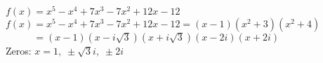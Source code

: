 {$f(x) = x^5 - x^4+7x^3-7x^2+12x-12$}
{$f(x) = x^5 - x^4+7x^3-7x^2+12x-12 = (x-1) \left(x^2 + 3\right) \left(x^2 + 4 \right)$ \\
$\phantom{f(x)} = (x-1)(x - i \sqrt{3})(x + i \sqrt{3})(x-2i)(x+2i)$ \\
Zeros:  $x = 1, \;  \pm  \sqrt{3}i,  \; \pm 2i$}